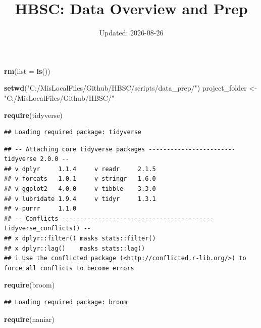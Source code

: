 \documentclass[
]{article}
\title{HBSC: Data Overview and Prep}
\author{}
\date{\vspace{-2.5em}Updated: 2026-08-26}
\newenvironment{Shaded}{\begin{snugshade}}{\end{snugshade}}
\newcommand{\AttributeTok}[1]{\textcolor[rgb]{0.13,0.29,0.53}{#1}}
\newcommand{\FunctionTok}[1]{\textcolor[rgb]{0.13,0.29,0.53}{\textbf{#1}}}
\newcommand{\NormalTok}[1]{#1}
\newcommand{\OtherTok}[1]{\textcolor[rgb]{0.56,0.35,0.01}{#1}}
\newcommand{\StringTok}[1]{\textcolor[rgb]{0.31,0.60,0.02}{#1}}
\begin{document}
\maketitle

\begin{Shaded}
\begin{Highlighting}[]
\FunctionTok{rm}\NormalTok{(}\AttributeTok{list =} \FunctionTok{ls}\NormalTok{())}

\FunctionTok{setwd}\NormalTok{(}\StringTok{"C:/MisLocalFiles/Github/HBSC/scripts/data\_prep/"}\NormalTok{)}
\NormalTok{project\_folder }\OtherTok{\textless{}{-}} \StringTok{"C:/MisLocalFiles/Github/HBSC/"}

\FunctionTok{require}\NormalTok{(tidyverse)}
\end{Highlighting}
\end{Shaded}

\begin{verbatim}
## Loading required package: tidyverse
\end{verbatim}

\begin{verbatim}
## -- Attaching core tidyverse packages ------------------------ tidyverse 2.0.0 --
## v dplyr     1.1.4     v readr     2.1.5
## v forcats   1.0.1     v stringr   1.6.0
## v ggplot2   4.0.0     v tibble    3.3.0
## v lubridate 1.9.4     v tidyr     1.3.1
## v purrr     1.1.0     
## -- Conflicts ------------------------------------------ tidyverse_conflicts() --
## x dplyr::filter() masks stats::filter()
## x dplyr::lag()    masks stats::lag()
## i Use the conflicted package (<http://conflicted.r-lib.org/>) to force all conflicts to become errors
\end{verbatim}

\begin{Shaded}
\begin{Highlighting}[]
\FunctionTok{require}\NormalTok{(broom)}
\end{Highlighting}
\end{Shaded}

\begin{verbatim}
## Loading required package: broom
\end{verbatim}

\begin{Shaded}
\begin{Highlighting}[]
\FunctionTok{require}\NormalTok{(naniar)}
\end{Highlighting}
\end{Shaded}
\end{document}
